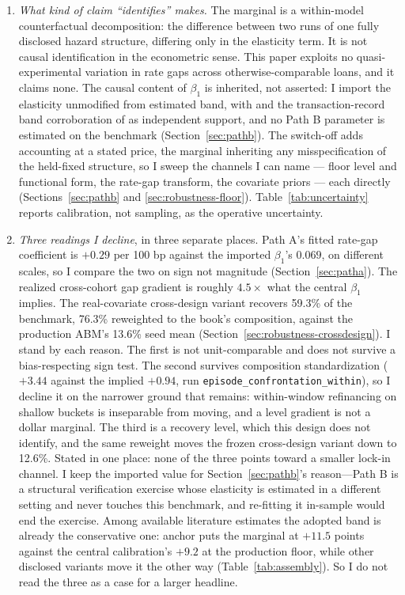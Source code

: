 \begin{enumerate}
\item \emph{What kind of claim ``identifies'' makes.} The marginal is a within-model counterfactual decomposition: the difference between two runs of one fully disclosed hazard structure, differing only in the elasticity term. It is not causal identification in the econometric sense. This paper exploits no quasi-experimental variation in rate gaps across otherwise-comparable loans, and it claims none. The causal content of $\beta_1$ is inherited, not asserted: I import the elasticity unmodified from  estimated band, with \citet{fonseca2024} and the transaction-record band corroboration of \citet{graybill2026} as independent support, and no Path B parameter is estimated on the benchmark (Section~\ref{sec:pathb}). The switch-off adds accounting at a stated price, the marginal inheriting any misspecification of the held-fixed structure, so I sweep the channels I can name --- floor level and functional form, the rate-gap transform, the covariate priors --- each directly (Sections~\ref{sec:pathb} and \ref{sec:robustness-floor}). Table~\ref{tab:uncertainty} reports calibration, not sampling, as the operative uncertainty.

\item \emph{Three readings I decline}, in three separate places. Path A's fitted rate-gap coefficient is $+0.29$ per 100 bp against the imported $\beta_1$'s $0.069$, on different scales, so I compare the two on sign not magnitude (Section~\ref{sec:patha}). The realized cross-cohort gap gradient is roughly $4.5\times$ what the central $\beta_1$ implies. The real-covariate cross-design variant recovers 59.3\% of the benchmark, 76.3\% reweighted to the book's composition, against the production ABM's 13.6\% seed mean (Section~\ref{sec:robustness-crossdesign}). I stand by each reason. The first is not unit-comparable and does not survive a bias-respecting sign test. The second survives composition standardization ($+3.44$ against the implied $+0.94$, run \texttt{episode\_confrontation\_within}), so I decline it on the narrower ground that remains: within-window refinancing on shallow buckets is inseparable from moving, and a level gradient is not a dollar marginal. The third is a recovery level, which this design does not identify, and the same reweight moves the frozen cross-design variant down to 12.6\%. Stated in one place: none of the three points toward a smaller lock-in channel. I keep the imported value for Section~\ref{sec:pathb}'s reason---Path B is a structural verification exercise whose elasticity is estimated in a different setting and never touches this benchmark, and re-fitting it in-sample would end the exercise. Among available literature estimates the adopted band is already the conservative one:  anchor puts the marginal at $+11.5$ points against the central calibration's $+9.2$ at the production floor, while other disclosed variants move it the other way (Table~\ref{tab:assembly}). So I do not read the three as a case for a larger headline.


\end{enumerate}
